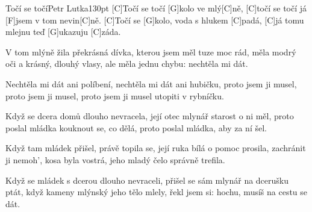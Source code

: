 \begin{song}{Točí se točí}{Petr Lutka}{130pt}
%
[C]Točí se točí [G]kolo ve mlý[C]ně,
[C]točí se točí já [F]jsem v tom nevin[C]ně.
[C]Točí se [G]kolo, voda s hlukem [C]padá,
[C]já tomu mlejnu teď [G]ukazuju [C]záda.

%
V tom mlýně žila překrásná dívka, 
kterou jsem měl tuze moc rád, 
měla modrý oči a krásný, dlouhý vlasy, 
ale měla jednu chybu: nechtěla mi dát. 

%
Nechtěla mi dát ani políbení, 
nechtěla mi dát ani hubičku, 
proto jsem ji musel, proto jsem ji musel,
proto jsem ji musel utopiti v rybníčku. 

%
Když se dcera domů dlouho nevracela, 
její otec mlynář starost o ni měl, 
proto poslal mládka kouknout se, co dělá, 
proto poslal mládka, aby za ní šel. 

%
Když tam mládek přišel, právě topila se,
její ruka bílá o pomoc prosila, 
zachránit ji nemoh', kosa byla vostrá, 
jeho mladý čelo správně trefila. 

%
Když se mládek s dcerou dlouho nevraceli, 
přišel se sám mlynář na dcerušku ptát, 
když kameny mlýnský jeho tělo mlely, 
řekl jsem si: hochu, musíš na cestu se dát.

\end{song}
